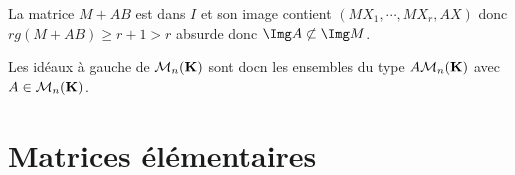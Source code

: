 La matrice $M+AB$ est dans $I$ et son image contient $(MX_1,\cdots,MX_r,AX)$ donc $rg(M+AB)\geq r+1 >r$ absurde donc $\Img A \not \subset \Img M$.

Les idéaux à gauche de $\mathcal M_n(\mathbf K)$ sont docn les ensembles du type $A \mathcal M_n(\mathbf K)$ avec $A \in \mathcal M_n(\mathbf K)$.


\section{Matrices élémentaires}


